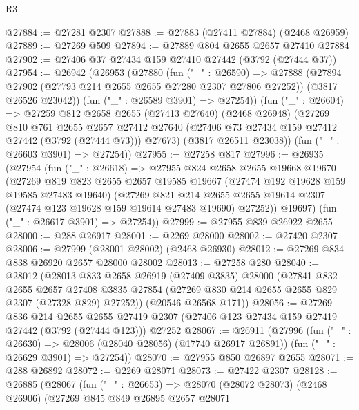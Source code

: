 \begin{lexlean}{R3}
\begin{coremodule}
@27884 := @27281 @2307
@27888 := @27883 (@27411 @27884) (@2468 @26959)
@27889 := @27269 @509
@27894 := @27889 @804 @2655 @2657 @27410 @27884
@27902 := @27406 @37 @27434 @159 @27410 @27442 (@3792 (@27444 @37))
@27954 := @26942
    (@26953
      (@27880
        (fun ("_" : @26590) =>
        @27888
          (@27894 @27902 (@27793 @214 @2655 @2655 @27280 @2307 @27806 @27252))
          (@3817 @26526 @23042))
        (fun ("_" : @26589 @3901) => @27254))
      (fun ("_" : @26604) =>
      @27259
        @812
        @2658
        @2655
        (@27413 @27640)
        (@2468 @26948)
        (@27269
          @810
          @761
          @2655
          @2657
          @27412
          @27640
          (@27406 @73 @27434 @159 @27412 @27442 (@3792 (@27444 @73)))
          @27673)
        (@3817 @26511 @23038))
      (fun ("_" : @26603 @3901) => @27254))
@27955 := @27258 @817
@27996 := @26935
    (@27954
      (fun ("_" : @26618) =>
      @27955
        @824
        @2658
        @2655
        @19668
        @19670
        (@27269
          @819
          @823
          @2655
          @2657
          @19585
          @19667
          (@27474 @192 @19628 @159 @19585 @27483 @19640)
          (@27269
            @821
            @214
            @2655
            @2655
            @19614
            @2307
            (@27474 @123 @19628 @159 @19614 @27483 @19690)
            @27252))
        @19697)
      (fun ("_" : @26617 @3901) => @27254))
@27999 := @27955 @839 @26922 @2655
@28000 := @288 @26917
@28001 := @2269 @28000
@28002 := @27420 @2307
@28006 := @27999 (@28001 @28002) (@2468 @26930)
@28012 := @27269 @834 @838 @26920 @2657 @28000 @28002
@28013 := @27258 @280
@28040 := @28012
    (@28013
      @833
      @2658
      @26919
      (@27409 @3835)
      @28000
      (@27841
        @832
        @2655
        @2657
        @27408
        @3835
        @27854
        (@27269 @830 @214 @2655 @2655 @829 @2307 (@27328 @829) @27252))
      (@20546 @26568 @171))
@28056 := @27269
    @836
    @214
    @2655
    @2655
    @27419
    @2307
    (@27406 @123 @27434 @159 @27419 @27442 (@3792 (@27444 @123)))
    @27252
@28067 := @26911
    (@27996
      (fun ("_" : @26630) => @28006 (@28040 @28056) (@17740 @26917 @26891))
      (fun ("_" : @26629 @3901) => @27254))
@28070 := @27955 @850 @26897 @2655
@28071 := @288 @26892
@28072 := @2269 @28071
@28073 := @27422 @2307
@28128 := @26885
    (@28067
      (fun ("_" : @26653) =>
      @28070
        (@28072 @28073)
        (@2468 @26906)
        (@27269
          @845
          @849
          @26895
          @2657
          @28071

\end{coremodule}
\end{lexlean}
